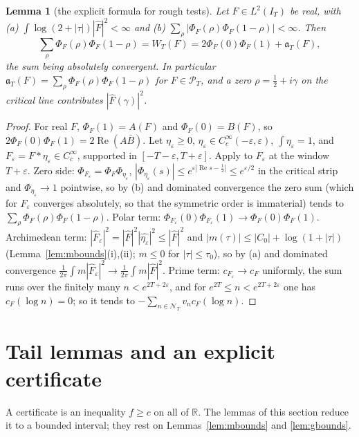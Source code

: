 \documentclass[11pt]{amsart}
\newtheorem{lemma}[theorem]{Lemma}
\theoremstyle{definition}
\theoremstyle{remark}
\newcommand{\R}{\mathbb R}
\newcommand{\Rel}{\operatorname{Re}}
\newcommand{\PT}{\mathcal P_T}
\newcommand{\IT}{I_T}
\newcommand{\Fh}{\widehat F}
\newcommand{\cF}{c_F}
\newcommand{\NT}{\mathcal N_T}
\begin{document}
\begin{lemma}[the explicit formula for rough tests]\label{lem:roughEF}
Let $F\in L^2(\IT)$ be real, with \emph{(a)} $\int\log(2+|\tau|)|\Fh|^2<\infty$ and \emph{(b)}
$\sum_\rho|\Phi_F(\rho)\Phi_F(1-\rho)|<\infty$. Then
\[
\sum_\rho\Phi_F(\rho)\Phi_F(1-\rho)=W_T(F)=2\Phi_F(0)\Phi_F(1)+\mathfrak a_T(F),
\]
the sum being absolutely convergent. In particular $\mathfrak a_T(F)=\sum_\rho\Phi_F(\rho)\Phi_F(1-\rho)$
for $F\in\PT$, and a zero $\rho=\frac12+i\gamma$ on the critical line contributes $|\Fh(\gamma)|^2$.
\end{lemma}
\begin{proof}
For real $F$, $\Phi_F(1)=A(F)$ and $\Phi_F(0)=B(F)$, so $2\Phi_F(0)\Phi_F(1)=2\Rel(A\bar B)$. Let
$\eta_\varepsilon\ge0$, $\eta_\varepsilon\in C_c^\infty(-\varepsilon,\varepsilon)$, $\int\eta_\varepsilon=1$,
and $F_\varepsilon=F*\eta_\varepsilon\in C_c^\infty$, supported in $[-T-\varepsilon,T+\varepsilon]$.
Apply \cite[Thm.~8.4]{Paper45} to $F_\varepsilon$ at the window $T+\varepsilon$. Zero side:
$\Phi_{F_\varepsilon}=\Phi_F\Phi_{\eta_\varepsilon}$, $|\Phi_{\eta_\varepsilon}(s)|\le e^{\varepsilon|\Rel s-\frac12|}\le e^{\varepsilon/2}$
in the critical strip and $\Phi_{\eta_\varepsilon}\to1$ pointwise, so by (b) and dominated convergence
the zero sum (which for $F_\varepsilon$ converges absolutely, so that the symmetric order is
immaterial) tends to $\sum_\rho\Phi_F(\rho)\Phi_F(1-\rho)$. Polar term:
$\Phi_{F_\varepsilon}(0)\Phi_{F_\varepsilon}(1)\to\Phi_F(0)\Phi_F(1)$. Archimedean term:
$|\Fh_\varepsilon|^2=|\Fh|^2|\widehat{\eta_\varepsilon}|^2\le|\Fh|^2$ and $|m(\tau)|\le|C_0|+\log(1+|\tau|)$
(Lemma~\ref{lem:mbounds}(i),(ii); $m\le0$ for $|\tau|\le\tau_0$), so by (a) and dominated convergence
$\frac1{2\pi}\int m|\Fh_\varepsilon|^2\to\frac1{2\pi}\int m|\Fh|^2$. Prime term: $c_{F_\varepsilon}\to\cF$
uniformly, the sum runs over the finitely many $n<e^{2T+2\varepsilon}$, and for
$e^{2T}\le n<e^{2T+2\varepsilon}$ one has $\cF(\log n)=0$; so it tends to $-\sum_{n\in\NT}v_n\cF(\log n)$.
\end{proof}


\section{Tail lemmas and an explicit certificate}\label{sec:tails}

A certificate is an inequality $f\ge c$ on all of $\R$. The lemmas of this section reduce it to a
bounded interval; they rest on Lemmas~\ref{lem:mbounds} and \ref{lem:gbounds}.
\end{document}
